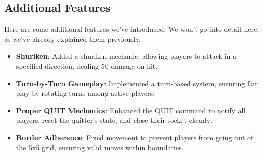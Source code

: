\documentclass{article}
\begin{document}
\subsection*{Additional Features}
Here are some additional features we've introduced. We won't go into detail here, as we've already explained them previously.
\begin{itemize}
    \item \textbf{Shuriken}: Added a shuriken mechanic, allowing players to attack in a specified direction, dealing 50 damage on hit.
    \item \textbf{Turn-by-Turn Gameplay}: Implemented a turn-based system, ensuring fair play by rotating turns among active players.
    \item \textbf{Proper QUIT Mechanics}: Enhanced the QUIT command to notify all players, reset the quitter's state, and close their socket cleanly.
    \item \textbf{Border Adherence}: Fixed movement to prevent players from going out of the 5x5 grid, ensuring valid moves within boundaries.
\end{itemize}
\end{document}
